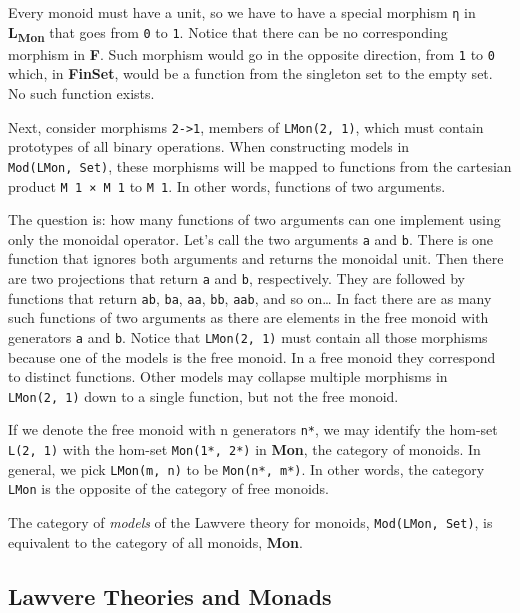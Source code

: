 Every monoid must have a unit, so we have to have a special morphism
\texttt{η} in \textbf{L\textsubscript{Mon}} that goes from \texttt{0} to
\texttt{1}. Notice that there can be no corresponding morphism in
\textbf{F}. Such morphism would go in the opposite direction, from
\texttt{1} to \texttt{0} which, in \textbf{FinSet}, would be a function
from the singleton set to the empty set. No such function exists.

Next, consider morphisms \texttt{2-\textgreater{}1}, members of
\texttt{LMon(2,\ 1)}, which must contain prototypes of all binary
operations. When constructing models in \texttt{Mod(LMon,\ Set)}, these
morphisms will be mapped to functions from the cartesian product
\texttt{M\ 1\ ×\ M\ 1} to \texttt{M\ 1}. In other words, functions of
two arguments.

The question is: how many functions of two arguments can one implement
using only the monoidal operator. Let's call the two arguments
\texttt{a} and \texttt{b}. There is one function that ignores both
arguments and returns the monoidal unit. Then there are two projections
that return \texttt{a} and \texttt{b}, respectively. They are followed
by functions that return \texttt{ab}, \texttt{ba}, \texttt{aa},
\texttt{bb}, \texttt{aab}, and so on\ldots{} In fact there are as many
such functions of two arguments as there are elements in the free monoid
with generators \texttt{a} and \texttt{b}. Notice that
\texttt{LMon(2,\ 1)} must contain all those morphisms because one of the
models is the free monoid. In a free monoid they correspond to distinct
functions. Other models may collapse multiple morphisms in
\texttt{LMon(2,\ 1)} down to a single function, but not the free monoid.

If we denote the free monoid with n generators \texttt{n*}, we may
identify the hom-set \texttt{L(2,\ 1)} with the hom-set
\texttt{Mon(1*,\ 2*)} in \textbf{Mon}, the category of monoids. In
general, we pick \texttt{LMon(m,\ n)} to be \texttt{Mon(n*,\ m*)}. In
other words, the category \texttt{LMon} is the opposite of the category
of free monoids.

The category of \emph{models} of the Lawvere theory for monoids,
\texttt{Mod(LMon,\ Set)}, is equivalent to the category of all monoids,
\textbf{Mon}.

\subsection{Lawvere Theories and
Monads}\label{lawvere-theories-and-monads}


